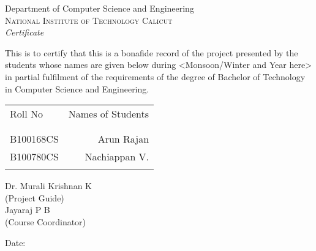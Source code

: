 \newpage
\thispagestyle{empty}

\begin{center}

\huge{Department of Computer Science and Engineering}\\[0.5cm]
\normalsize
\textsc{National Institute of Technology Calicut}\\[2.0cm]

\emph{\LARGE Certificate}\\[2.5cm]
\end{center}
\normalsize This is to certify that this is a bonafide record of the project presented by the students whose names are given below during <Monsoon/Winter and Year here> in partial fulfilment of the requirements of the degree of Bachelor of Technology in Computer Science and Engineering.\\[1.0cm]

\begin{table}[h]
\centering
\begin{tabular}{lr}
Roll No & Names of Students \\ \\ \hline
\\
B100168CS & Arun Rajan \\
B100780CS & Nachiappan V. \\ \\ \hline 
\end{tabular}
\end{table}

\vfill


\begin{flushright}
Dr. Murali Krishnan K\\
(Project Guide)\\[1.5cm]
Jayaraj P B\\
(Course Coordinator)\\
\end{flushright}

\begin{flushleft}
Date:
\end{flushleft}
